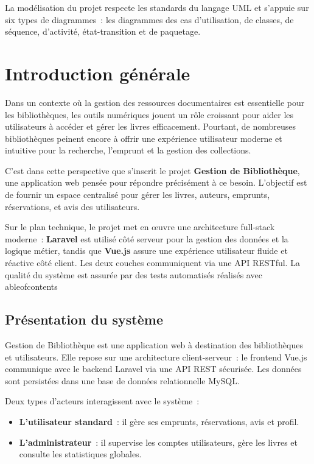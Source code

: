 ﻿\documentclass[12pt,a4paper]{report}
\begin{document}
La mod\'elisation du projet respecte les standards du langage UML et s'appuie sur
six types de diagrammes~: les diagrammes des cas d'utilisation, de classes, de
s\'equence, d'activit\'e, \'etat-transition et de paquetage.

\newpage
\tableofcontents
\newpage
\listoffigures
\newpage
{}

\chapter*{Introduction générale}

Dans un contexte o\`u la gestion des ressources documentaires est essentielle pour les biblioth\`eques,
les outils numériques jouent un r\^ole croissant pour aider les utilisateurs \`a
accéder et gérer les livres efficacement. Pourtant, de nombreuses biblioth\`eques peinent encore \`a
offrir une expérience utilisateur moderne et intuitive pour la recherche, l'emprunt et la gestion
des collections.

C'est dans cette perspective que s'inscrit le projet \textbf{Gestion de Bibliothèque}, une application
web pensée pour répondre précisément \`a ce besoin. L'objectif est de fournir un espace
centralisé pour gérer les livres, auteurs, emprunts, réservations, et avis des utilisateurs.

Sur le plan technique, le projet met en œuvre une architecture full-stack moderne~:
\textbf{Laravel} est utilisé côté serveur pour la gestion des données et la
logique métier, tandis que \textbf{Vue.js} assure une expérience utilisateur fluide
et réactive côté client. Les deux couches communiquent via une API RESTful. La
qualité du système est assurée par des tests automatisés réalisés avec
    ableofcontents
\section{Présentation du système}

Gestion de Bibliothèque est une application web à destination des bibliothèques et utilisateurs.
Elle repose sur une architecture client-serveur~: le frontend Vue.js communique avec le backend Laravel via
une API REST sécurisée. Les données sont persistées dans une base de données
relationnelle MySQL.

Deux types d'acteurs interagissent avec le système~:
\begin{itemize}
    \item \textbf{L'utilisateur standard}~: il gère ses emprunts, réservations, avis et profil.
    \item \textbf{L'administrateur}~: il supervise les comptes utilisateurs, gère les livres et
          consulte les statistiques globales.
\end{itemize}
\end{document}
